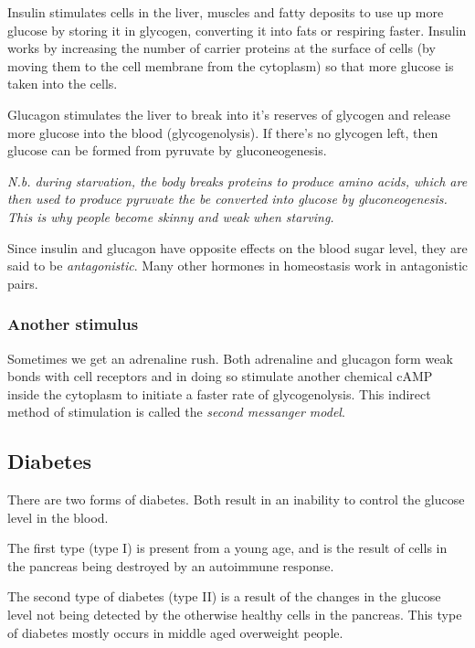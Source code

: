 \documentclass{article}
\begin{document}
Insulin stimulates cells in the liver, muscles and fatty deposits to use up more
glucose by storing it in glycogen, converting it into fats or respiring faster.
Insulin works by increasing the number of carrier proteins at the surface of
cells (by moving them to the cell membrane from the cytoplasm) so that more
glucose is taken into the cells.

Glucagon stimulates the liver to break into it's reserves of glycogen and
release more glucose into the blood (glycogenolysis). If there's no glycogen
left, then glucose can be formed from pyruvate by gluconeogenesis.

{\it N.b. during starvation, the body breaks proteins to produce amino acids,
which are then used to produce pyruvate the be converted into glucose by
gluconeogenesis. This is why people become skinny and weak when starving.}

Since insulin and glucagon have opposite effects on the blood sugar level, they
are said to be {\it antagonistic}. Many other hormones in homeostasis work in
antagonistic pairs. 

\subsubsection*{Another stimulus}

Sometimes we get an adrenaline rush. Both adrenaline and glucagon form weak
bonds with cell receptors and in doing so stimulate another chemical cAMP inside
the cytoplasm to initiate a faster rate of glycogenolysis. This indirect method
of stimulation is called the {\it second messanger model}.

\subsection*{Diabetes}

There are two forms of diabetes. Both result in an inability to control the
glucose level in the blood.

The first type (type I) is present from a young age, and is the result of cells
in the pancreas being destroyed by an autoimmune response.

The second type of diabetes (type II) is a result of the changes in the glucose
level not being detected by the otherwise healthy cells in the pancreas. This
type of diabetes mostly occurs in middle aged overweight people.
\end{document}
